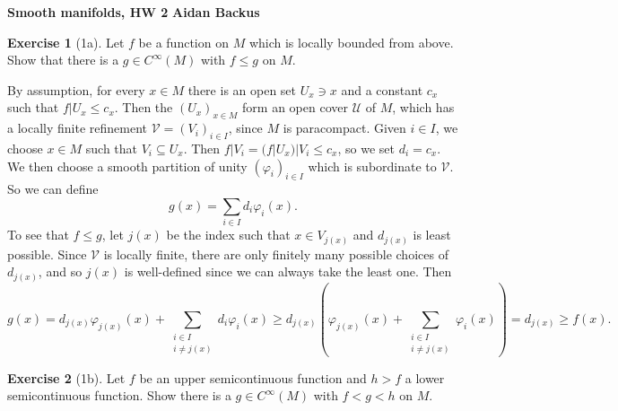 \documentclass[10pt]{article}
\theoremstyle{definition}
\newtheorem{exer}{Exercise}
\begin{document}
\noindent
\large\textbf{Smooth manifolds, HW 2} \hfill \textbf{Aidan Backus} \\


\begin{exer}[1a]
Let $f$ be a function on $M$ which is locally bounded from above. Show that there is a $g \in C^\infty(M)$ with $f \leq g$ on $M$.
\end{exer}

By assumption, for every $x \in M$ there is an open set $U_x \ni x$ and a constant $c_x$ such that $f|U_x \leq c_x$.
Then the $(U_x)_{x \in M}$ form an open cover $\mathcal U$ of $M$, which has a locally finite refinement $\mathcal V = (V_i)_{i \in I}$, since $M$ is paracompact.
Given $i \in I$, we choose $x \in M$ such that $V_i \subseteq U_x$. Then $f|V_i = (f|U_x)|V_i \leq c_x$, so we set $d_i = c_x$.
We then choose a smooth partition of unity $(\varphi_i)_{i \in I}$ which is subordinate to $\mathcal V$.
So we can define
$$g(x) = \sum_{i \in I} d_i \varphi_i(x).$$
To see that $f \leq g$, let $j(x)$ be the index such that $x \in V_{j(x)}$ and $d_{j(x)}$ is least possible.
Since $\mathcal V$ is locally finite, there are only finitely many possible choices of $d_{j(x)}$, and so $j(x)$ is well-defined since we can always take the least one.
Then
$$g(x) = d_{j(x)} \varphi_{j(x)}(x) + \sum_{\substack{i \in I\\i \neq j(x)}} d_i \varphi_i(x) \geq d_{j(x)} \left(\varphi_{j(x)}(x) + \sum_{\substack{i \in I\\i \neq j(x)}} \varphi_i(x)\right) = d_{j(x)} \geq f(x).$$

\begin{exer}[1b]
Let $f$ be an upper semicontinuous function and $h > f$ a lower semicontinuous function.
Show there is a $g \in C^\infty(M)$ with $f < g < h$ on $M$.
\end{exer}
\end{document}
